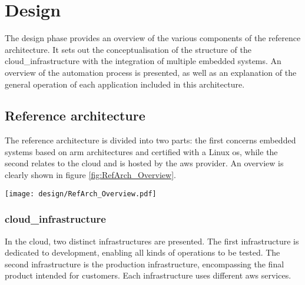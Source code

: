 

\chapter{Design}
\label{chap:design}

The design phase provides an overview of the various components of the reference architecture. It sets out the conceptualisation of the structure of the \gls{cloud_infrastructure} with the integration of multiple embedded systems. An overview of the automation process is presented, as well as an explanation of the general operation of each application included in this architecture.

\minitoc
\newpage

\section{Reference architecture}

The reference architecture is divided into two parts: the first concerns embedded systems based on \gls{arm} architectures and certified  with a Linux \acrlong{os}, while the second relates to the \gls{cloud} and is hosted by the \gls{aws} provider. An overview is clearly shown in figure \ref{fig:RefArch_Overview}.
\begin{center}
    \begingroup
    \texttt{[image: design/RefArch\_Overview.pdf]}
    \label{fig:RefArch_Overview}
    \endgroup
\end{center}

\subsection{\Gls{cloud_infrastructure}}
In the \gls{cloud}, two distinct infrastructures are presented. The first infrastructure is dedicated to development, enabling all kinds of operations to be tested. The second infrastructure is the production infrastructure, encompassing the final product intended for customers. Each infrastructure uses different \gls{aws} services.

